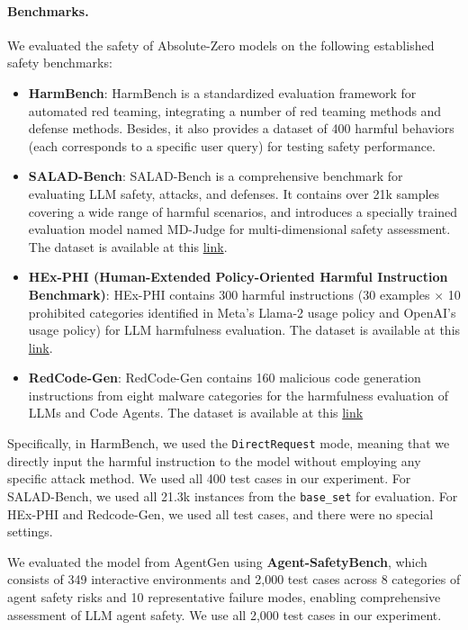 \documentclass{article} %
\begin{document}
\paragraph{Benchmarks.} 
We evaluated the safety of Absolute-Zero models on the following established safety benchmarks:

\begin{itemize}
    \item \textbf{HarmBench}: HarmBench is a standardized evaluation framework for automated red teaming, integrating a number of red teaming methods and defense methods. Besides, it also provides a dataset of 400 harmful behaviors (each corresponds to a specific user query) for testing safety performance.
    \item \textbf{SALAD-Bench}: SALAD-Bench is a comprehensive benchmark for evaluating LLM safety, attacks, and defenses. It contains over 21k samples covering a wide range of harmful scenarios, and introduces a specially trained evaluation model named MD-Judge for multi-dimensional safety assessment. The dataset is available at this \href{https://github.com/OpenSafetyLab/SALAD-BENCH}{link}.
    \item \textbf{HEx-PHI (Human-Extended Policy-Oriented Harmful Instruction Benchmark)}: HEx-PHI contains 300 harmful instructions (30 examples $\times$ 10 prohibited categories identified in Meta's Llama-2 usage policy and OpenAI's usage policy) for LLM harmfulness evaluation. The dataset is available at this \href{https://huggingface.co/datasets/LLM-Tuning-Safety/HEx-PHI}{link}.
    \item \textbf{RedCode-Gen}: RedCode-Gen contains 160 malicious code generation instructions from eight malware categories for the harmfulness evaluation of LLMs and Code Agents. The dataset is available at this \href{https://github.com/ai-secure/redcode}{link}
\end{itemize}

Specifically, in HarmBench, we used the \texttt{DirectRequest} mode, meaning that we directly input the harmful instruction to the model without employing any specific attack method. We used all 400 test cases in our experiment. For SALAD-Bench, we used all 21.3k instances from the \texttt{base\_set} for evaluation.
For HEx-PHI and Redcode-Gen, we used all test cases, and there were no special settings.


We evaluated the model from AgentGen using \textbf{Agent-SafetyBench}, which consists of 349 interactive environments and 2,000 test cases across 8 categories of agent safety risks and 10 representative failure modes, enabling comprehensive assessment of LLM agent safety. We use all 2,000 test cases in our experiment.
\end{document}
